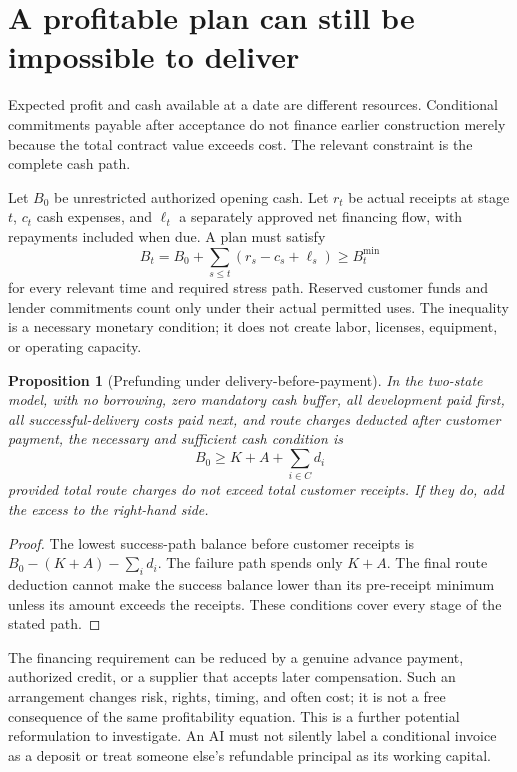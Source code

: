 \documentclass[11pt,letterpaper]{article}
\newtheorem{proposition}{Proposition}[section]
\theoremstyle{remark}\newtheorem{remark}{Remark}[section]
\begin{document}
\section{A profitable plan can still be impossible to deliver}
\label{sec:liquidity}
Expected profit and cash available at a date are different resources. Conditional commitments payable after acceptance do not finance earlier construction merely because the total contract value exceeds cost. The relevant constraint is the complete cash path.

Let $B_0$ be unrestricted authorized opening cash. Let $r_t$ be actual receipts at stage $t$, $c_t$ cash expenses, and $\ell_t$ a separately approved net financing flow, with repayments included when due. A plan must satisfy
\begin{equation}\label{eq:cash}
B_t=B_0+\sum_{s\le t}(r_s-c_s+\ell_s)\ge B_t^{\min}
\end{equation}
for every relevant time and required stress path. Reserved customer funds and lender commitments count only under their actual permitted uses. The inequality is a necessary monetary condition; it does not create labor, licenses, equipment, or operating capacity.

\begin{proposition}[Prefunding under delivery-before-payment]\label{prop:liquidity}
In the two-state model, with no borrowing, zero mandatory cash buffer, all development paid first, all successful-delivery costs paid next, and route charges deducted after customer payment, the necessary and sufficient cash condition is
\begin{equation}\label{eq:prefund}
B_0\ge K+A+\sum_{i\in C}d_i
\end{equation}
provided total route charges do not exceed total customer receipts. If they do, add the excess to the right-hand side.
\end{proposition}
\begin{proof}
The lowest success-path balance before customer receipts is $B_0-(K+A)-\sum_i d_i$. The failure path spends only $K+A$. The final route deduction cannot make the success balance lower than its pre-receipt minimum unless its amount exceeds the receipts. These conditions cover every stage of the stated path.
\end{proof}

The financing requirement can be reduced by a genuine advance payment, authorized credit, or a supplier that accepts later compensation. Such an arrangement changes risk, rights, timing, and often cost; it is not a free consequence of the same profitability equation. This is a further potential reformulation to investigate. An AI must not silently label a conditional invoice as a deposit or treat someone else's refundable principal as its working capital.
\end{document}
